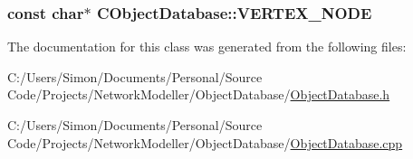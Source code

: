 \subsubsection[{V\+E\+R\+T\+E\+X\+\_\+\+N\+O\+D\+E}]{\setlength{\rightskip}{0pt plus 5cm}const char$\ast$ C\+Object\+Database\+::\+V\+E\+R\+T\+E\+X\+\_\+\+N\+O\+D\+E}\label{class_c_object_database_a23d016284e7c7d76a10b2e50d132711a}


The documentation for this class was generated from the following files\+:\begin{DoxyCompactItemize}
\item 
C\+:/\+Users/\+Simon/\+Documents/\+Personal/\+Source Code/\+Projects/\+Network\+Modeller/\+Object\+Database/\hyperlink{_object_database_8h}{Object\+Database.\+h}\item 
C\+:/\+Users/\+Simon/\+Documents/\+Personal/\+Source Code/\+Projects/\+Network\+Modeller/\+Object\+Database/\hyperlink{_object_database_8cpp}{Object\+Database.\+cpp}\end{DoxyCompactItemize}
